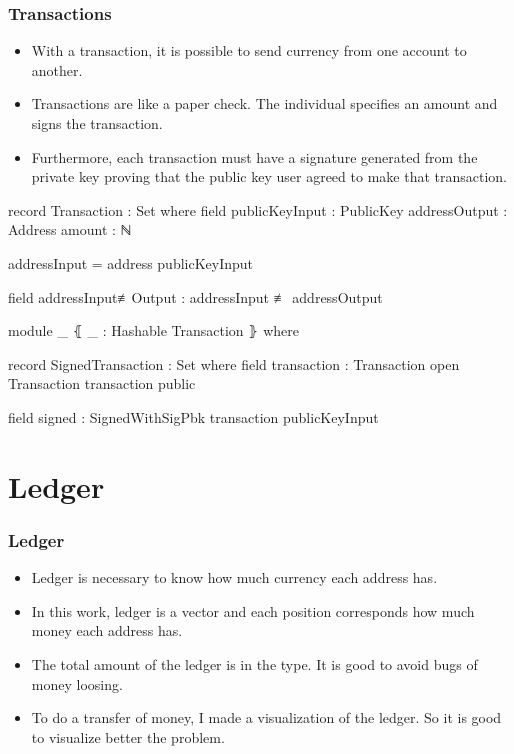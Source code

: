 \documentclass{beamer}
\begin{document}
\begin{frame}
   \frametitle{Transactions}
   \begin{itemize}[<+->]
     \item With a transaction, it is possible to send currency from one account to another.
     \item Transactions are like a paper check. The individual specifies an amount and signs the transaction.
    \item Furthermore, each transaction must have a signature generated from the private key proving that the public key user agreed to make that transaction.
   \end{itemize}
\end{frame}

\begin{frame}
\begin{code}
  record Transaction : Set where
    field
      publicKeyInput : PublicKey
      addressOutput  : Address
      amount         : ℕ

    addressInput = address publicKeyInput

    field
      addressInput≢Output : addressInput ≢ addressOutput

\end{code}
\end{frame}

\begin{frame}
\begin{code}

  module _ ⦃ _ : Hashable Transaction ⦄ where

    record SignedTransaction  : Set where
      field
        transaction : Transaction
      open Transaction transaction public

      field
        signed : SignedWithSigPbk transaction publicKeyInput
\end{code}
\end{frame}

\section{Ledger}

\begin{frame}
  \frametitle{Ledger}
   \begin{itemize}[<+->]
     \item Ledger is necessary to know how much currency each address has.
     \item In this work, ledger is a vector and each position corresponds how much money each address has.
     \item The total amount of the ledger is in the type. It is good to avoid bugs of money loosing.
     \item To do a transfer of money, I made a visualization of the ledger.
       So it is good to visualize better the problem.
   \end{itemize}
\end{frame}
\end{document}
